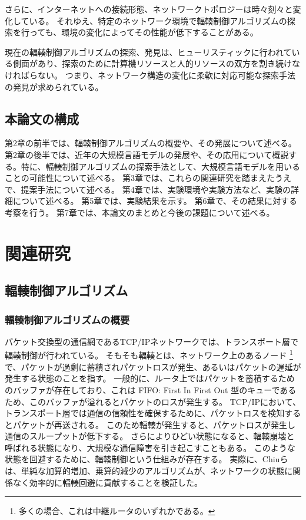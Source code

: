 \documentclass[a4paper,11pt]{jreport}
\begin{document}
さらに、インターネットへの接続形態、ネットワークトポロジーは時々刻々と変化している。
それゆえ、特定のネットワーク環境で輻輳制御アルゴリズムの探索を行っても、環境の変化によってその性能が低下することがある。

現在の輻輳制御アルゴリズムの探索、発見は、ヒューリスティックに行われている側面があり、探索のために計算機リソースと人的リソースの双方を割き続けなければらない。
つまり、ネットワーク構造の変化に柔軟に対応可能な探索手法の発見が求められている。

\newpage

\section{本論文の構成}

第2章の前半では、輻輳制御アルゴリズムの概要や、その発展について述べる。
第2章の後半では、近年の大規模言語モデルの発展や、その応用について概説する。特に、輻輳制御アルゴリズムの探索手法として、大規模言語モデルを用いることの可能性について述べる。
第3章では、これらの関連研究を踏まえたうえで、提案手法について述べる。
第4章では、実験環境や実験方法など、実験の詳細について述べる。
第5章では、実験結果を示す。
第6章で、その結果に対する考察を行う。
第7章では、本論文のまとめと今後の課題について述べる。

\newpage

\chapter{関連研究}
\section{輻輳制御アルゴリズム}

\subsection{輻輳制御アルゴリズムの概要}

パケット交換型の通信網であるTCP/IPネットワークでは、トランスポート層で輻輳制御が行われている。
そもそも輻輳とは、ネットワーク上のあるノード
\footnote{多くの場合、これは中継ルータのいずれかである。}
で、パケットが過剰に蓄積されパケットロスが発生、あるいはパケットの遅延が発生する状態のことを指す。
一般的に、ルータ上ではパケットを蓄積するためのバッファが存在しており、これは FIFO: First In First Out 型のキューであるため、このバッファが溢れるとパケットのロスが発生する。
TCP/IPにおいて、トランスポート層では通信の信頼性を確保するために、パケットロスを検知するとパケットが再送される。
このため輻輳が発生すると、パケットロスが発生し通信のスループットが低下する。
さらによりひどい状態になると、輻輳崩壊と呼ばれる状態になり、大規模な通信障害を引き起こすこともある。
このような状態を回避するために、輻輳制御という仕組みが存在する。
実際に、Chiuら\cite{CHIU19891}は、単純な加算的増加、乗算的減少のアルゴリズムが、ネットワークの状態に関係なく効率的に輻輳回避に貢献することを検証した。
\end{document}
